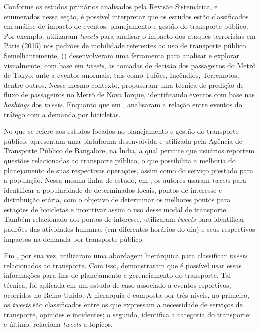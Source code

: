 \documentclass[
	12pt,				%
	oneside,			%
	a4paper,			%
	english,			%
	brazil				%
	]{abntex2ppgsi}
\begin{document}
{{{Conforme os estudos primários analisados pela Revisão Sistemática, e enumerados nessa seção, é possível interpretar que os estudos estão classificados em análise de impacto de eventos, planejamento e gestão do transporte público. Por exemplo, \cite{Wen2016} utilizaram \textit{tweets} para analisar o impacto dos ataques terroristas em Paris (2015) nos padrões de mobilidade referentes ao uso de transporte público. Semelhantemente, \citeauthor{Itoh2016} (\citeyear{Itoh2016}) desenvolveram uma ferramenta para analisar e explorar visualmente, com base em \textit{tweets}, as tomadas de decisão dos passageiros do Metrô de Tokyo, ante a eventos anormais, tais como Tufões, Incêndios, Terremotos, dentre outros. Nesse mesmo contexto, \cite{Ni2016} propuseram uma técnica de predição de fluxo de passageiros no Metrô de Nova Iorque, identificando eventos com base nas \textit{hashtags} dos \textit{tweets}. Enquanto que em \cite{Chen2016}, analisaram a relação entre eventos do tráfego com a demanda por bicicletas.

No que se refere aos estudos focados no planejamento e gestão do transporte público, \cite{Mukherjee2015} apresentam uma plataforma desenvolvida e utilizada pela Agência de Transporte Público de Bangalore, na Índia, a qual permite que usuários reportem questões relacionadas ao transporte  público, o que possibilita a melhoria do planejamento de suas respectivas operações, assim como do serviço prestado para a população. Nessa mesma linha de estudo, em \cite{Gutev2016}, os autores usaram \textit{tweets} para identificar a popularidade de determinados locais, pontos de interesse e distribuição etária, com o objetivo de determinar os melhores pontos para estações de bicicletas e incentivar assim o uso desse modal de transporte. Também relacionado aos pontos de interesse, \cite{Maghrebi2015} utilizaram \textit{tweets} para identificar padrões das atividades humanas (em diferentes horários do dia) e seus respectivos impactos na demanda por transporte público.

Em \cite{Gal-Tzur2014}, por sua vez, utilizaram uma abordagem hierárquica para classificar \textit{tweets} relacionados ao transporte. Com isso, demonstraram que é possível usar essas informações para fins de planejamento e gerenciamento do transporte. Tal técnica, foi aplicada em um estudo de caso associado a eventos esportivos, ocorridos no Reino Unido. A hierarquia é composta por três níveis, no primeiro, os \textit{tweets} são classificados entre os que expressam a necessidade de serviços de transporte, opiniões e incidentes; o segundo, identifica a categoria do transporte; e último, relaciona \textit{tweets} a tópicos. 

}}}
\end{document}
